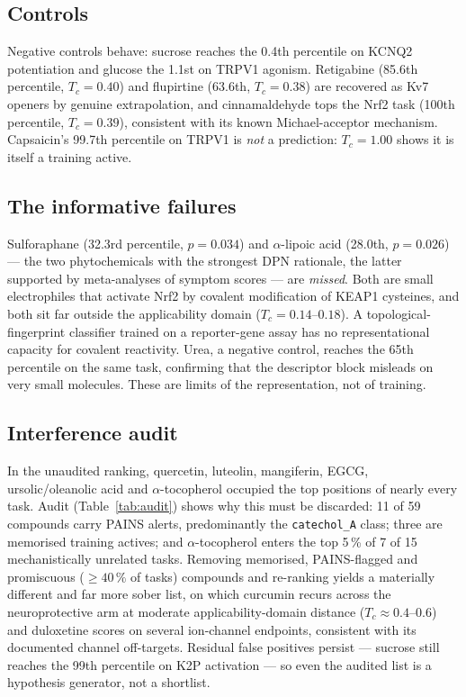 \documentclass[conference]{IEEEtran}
\begin{document}
\subsection{Controls}
Negative controls behave: sucrose reaches the 0.4th percentile on KCNQ2
potentiation and glucose the 1.1st on TRPV1 agonism. Retigabine (85.6th
percentile, $T_c{=}0.40$) and flupirtine (63.6th, $T_c{=}0.38$) are recovered as
Kv7 openers by genuine extrapolation, and cinnamaldehyde tops the Nrf2 task
(100th percentile, $T_c{=}0.39$), consistent with its known Michael-acceptor
mechanism. Capsaicin's 99.7th percentile on TRPV1 is \emph{not} a prediction:
$T_c{=}1.00$ shows it is itself a training active.

\subsection{The informative failures}
Sulforaphane (32.3rd percentile, $p{=}0.034$) and $\alpha$-lipoic acid (28.0th,
$p{=}0.026$) --- the two phytochemicals with the strongest DPN rationale, the
latter supported by meta-analyses of symptom scores --- are \emph{missed}. Both
are small electrophiles that activate Nrf2 by covalent modification of KEAP1
cysteines, and both sit far outside the applicability domain
($T_c{=}0.14$--$0.18$). A topological-fingerprint classifier trained on a
reporter-gene assay has no representational capacity for covalent reactivity.
Urea, a negative control, reaches the 65th percentile on the same task,
confirming that the descriptor block misleads on very small molecules. These are
limits of the representation, not of training.

\subsection{Interference audit}
In the unaudited ranking, quercetin, luteolin, mangiferin, EGCG,
ursolic/oleanolic acid and $\alpha$-tocopherol occupied the top positions of
nearly every task. Audit (Table~\ref{tab:audit}) shows why this must be
discarded: 11 of 59 compounds carry PAINS alerts, predominantly the
\texttt{catechol\_A} class; three are memorised training actives; and
$\alpha$-tocopherol enters the top 5\,\% of 7 of 15 mechanistically unrelated
tasks. Removing memorised, PAINS-flagged and promiscuous ($\ge 40\,\%$ of tasks)
compounds and re-ranking yields a materially different and far more sober list,
on which curcumin recurs across the neuroprotective arm at moderate
applicability-domain distance ($T_c \approx 0.4$--$0.6$) and duloxetine scores on
several ion-channel endpoints, consistent with its documented channel
off-targets. Residual false positives persist --- sucrose still reaches the 99th
percentile on K2P activation --- so even the audited list is a hypothesis
generator, not a shortlist.
\end{document}
